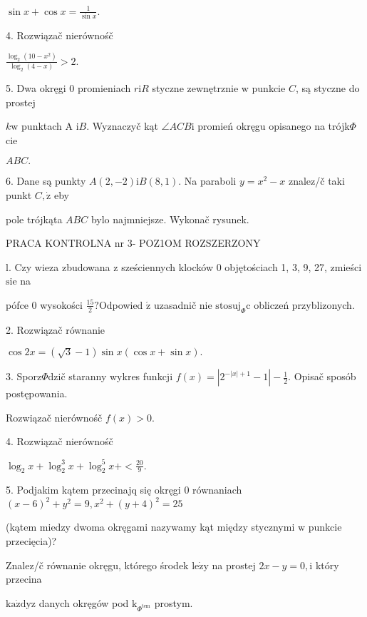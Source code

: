 \documentclass[a4paper,12pt]{article}
\begin{document}
$\displaystyle \sin x+\cos x=\frac{1}{\sin x}.$

4. Rozwiązač nierównośč

$\displaystyle \frac{\log_{2}(10-x^{2})}{\log_{2}(4-x)}>2.$

5. Dwa okręgi $0$ promieniach $r\mathrm{i}R$ styczne zewnętrznie $\mathrm{w}$ punkcie $C$, są styczne do prostej

$k\mathrm{w}$ punktach A $\mathrm{i}B$. Wyznaczyč kąt $\angle ACB\mathrm{i}$ promień okręgu opisanego na trójk$\Phi$cie

$ABC.$

6. Dane są punkty $A(2,-2)\mathrm{i}B(8,1)$. Na paraboli $y=x^{2}-x$ znalez/č taki punkt $C, \dot{\mathrm{z}}$ eby

pole trójkąta $ABC$ bylo najmniejsze. Wykonač rysunek.




PRACA KONTROLNA nr 3- POZ1OM ROZSZERZONY

l. Czy wieza zbudowana $\mathrm{z}$ sześciennych klocków $0$ objętościach 1, 3, 9, 27, zmieści $\mathrm{s}\mathrm{i}\mathrm{e}$ na

pófce $0$ wysokości $\displaystyle \frac{15}{2}?$Odpowied $\acute{\mathrm{z}}$ uzasadnič nie $\mathrm{s}\mathrm{t}\mathrm{o}\mathrm{s}\mathrm{u}\mathrm{j}_{\Phi}\mathrm{c}$ obliczeń przyblizonych.

2. Rozwiązač równanie

$\cos 2x=(\sqrt{3}-1)\sin x(\cos x+\sin x).$

3. Sporz$\Phi$dzič staranny wykres funkcji $f(x)=|2^{-|x|+1}-1|-\displaystyle \frac{1}{2}$. Opisač sposób postępowania.

Rozwiązač nierównośč $f(x)>0.$

4. Rozwiązač nierównośč

$\displaystyle \log_{2}x+\log_{2}^{3}x+\log_{2}^{5}x+<\frac{20}{9}.$

5. Podjakim kątem przecinajq się okręgi $0$ równaniach $(x-6)^{2}+y^{2}=9, x^{2}+(y+4)^{2}=25$

(kątem miedzy dwoma okręgami nazywamy kąt między stycznymi $\mathrm{w}$ punkcie przecięcia)?

Znalez/č równanie okręgu, którego środek $\mathrm{l}\mathrm{e}\dot{\mathrm{z}}\mathrm{y}$ na prostej $2x-y=0, \mathrm{i}$ który przecina

$\mathrm{k}\mathrm{a}\dot{\mathrm{z}}\mathrm{d}\mathrm{y}\mathrm{z}$ danych okręgów pod $\mathrm{k}_{\Phi^{\mathrm{t}\mathrm{e}\mathrm{m}}}$ prostym.
\end{document}
